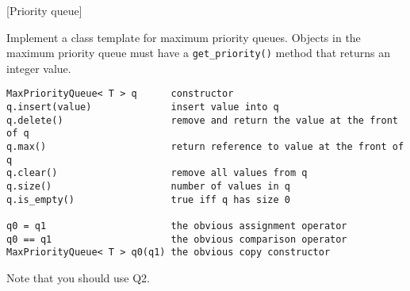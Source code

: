 [Priority queue]

Implement a class template for maximum priority queues.
Objects in the maximum priority queue must have a
\texttt{get\_priority()} method
that returns an integer value.
\begin{Verbatim}[frame=single]
MaxPriorityQueue< T > q      constructor
q.insert(value)              insert value into q
q.delete()                   remove and return the value at the front of q
q.max()                      return reference to value at the front of q
q.clear()                    remove all values from q
q.size()                     number of values in q
q.is_empty()                 true iff q has size 0

q0 = q1                      the obvious assignment operator
q0 == q1                     the obvious comparison operator
MaxPriorityQueue< T > q0(q1) the obvious copy constructor
\end{Verbatim}

Note that you should use Q2.

